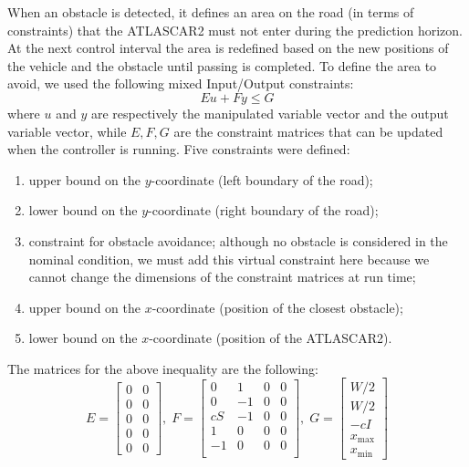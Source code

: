 \documentclass[conference,11pt]{IEEEtran}
\renewcommand{\vec}[1]{\ensuremath{\boldsymbol{\mathit{#1}}}}
\begin{document}
When an obstacle is detected, it defines an area on the road (in terms of constraints) that the ATLASCAR2 must not enter during the prediction horizon. At the next control interval the area is redefined based on the new positions of the vehicle and the obstacle until passing is completed.
To define the area to avoid, we used the following mixed Input/Output constraints:
\begin{equation*}
	\label{eqn:mixed_IO_constraints}
	\vec{E}\vec{u}+\vec{F}\vec{y}\leq \vec{G}
\end{equation*}
where $\vec{u}$ and $\vec{y}$ are respectively the manipulated variable vector and the output variable vector, while $\vec{E},\vec{F},\vec{G}$ are the constraint matrices that can be updated when the controller is running. Five constraints were defined:
\begin{enumerate}
	\item upper bound on the $y$-coordinate (left boundary of the road);
	\item lower bound on the $y$-coordinate (right boundary of the road);
	\item constraint for obstacle avoidance; although no obstacle is considered in the nominal condition, we must add this virtual constraint here because we cannot change the dimensions of the constraint matrices at run time;
	\item upper bound on the $x$-coordinate (position of the closest obstacle);
	\item lower bound on the $x$-coordinate (position of the ATLASCAR2).
\end{enumerate}
The matrices for the above inequality are the following:
\[
\vec{E}= 
\begin{bmatrix}
0&0\\
0&0\\
0&0\\
0&0\\
0&0
\end{bmatrix},
\;
\vec{F}=\begin{bmatrix}
0&1&0&0\\
0&-1&0&0\\
cS&-1&0&0\\
1&0&0&0\\
-1&0&0&0\\
\end{bmatrix},\;
\vec{G}=
\begin{bmatrix}
W/2\\W/2\\-cI\\x_{\max}\\x_{\min}
\end{bmatrix}
\]
\end{document}
